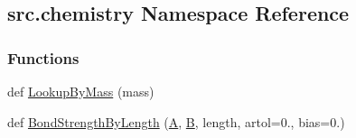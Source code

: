 \hypertarget{namespacesrc_1_1chemistry}{}\subsection{src.\+chemistry Namespace Reference}
\label{namespacesrc_1_1chemistry}
\subsubsection*{Functions}
\begin{DoxyCompactItemize}
\item 
def \hyperlink{namespacesrc_1_1chemistry_a50b3f355bb12e82be0dbb81daac82e3e}{Lookup\+By\+Mass} (mass)
\item 
def \hyperlink{namespacesrc_1_1chemistry_af789b97935f83fc42345ad5b07a11174}{Bond\+Strength\+By\+Length} (\hyperlink{namespacesrc_1_1chemistry_aa6456b6409fde4637bee2fb18999d881}{A}, \hyperlink{namespacesrc_1_1chemistry_a43668732826c79b3179214cf463b5d70}{B}, length, artol=0., bias=0.)
\end{DoxyCompactItemize}
